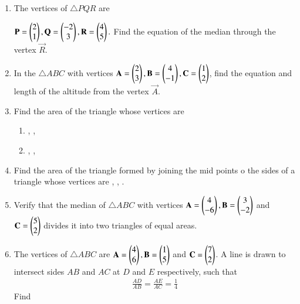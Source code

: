 \begin{enumerate}[label=\arabic*.,ref=\thesubsection.\theenumi]
\item The vertices of $\triangle PQR$ are 

$
\mathbf{P} = \begin{pmatrix}2 \\1\end{pmatrix},
\mathbf{Q} = \begin{pmatrix}-2\\3\end{pmatrix},
\mathbf{R} = \begin{pmatrix}4\\5\end{pmatrix}.
$
Find the equation of the median through the vertex $\vec{R}$.
\item In the $\triangle ABC$ with vertices
$
\mathbf{A}=\begin{pmatrix}2\\3\end{pmatrix}, 
\mathbf{B}=\begin{pmatrix}4\\-1\end{pmatrix},
 \mathbf{C}=\begin{pmatrix}1\\2\end{pmatrix}
$,
find the equation and length of the altitude from the vertex $\vec{A}$.
\item Find the area of the triangle whose vertices are
\begin{enumerate}
\item {}, ,  
\item  {},  ,  
\end{enumerate}
\item Find the area of the triangle formed by joining the mid points o the sides of a triangle whose vertices are  ,  ,  .
\item Verify that the median of $\triangle ABC$ with vertices $\mathbf{A}=\begin{pmatrix}4\\-6\end{pmatrix},  \mathbf{B}=\begin{pmatrix}3\\-2\end{pmatrix}$ and  $\mathbf{C} =  \begin{pmatrix}5\\2\end{pmatrix}$ divides it into two triangles of equal areas.
\item The vertices of $\triangle ABC$ are $\mathbf{A}=\begin{pmatrix}4\\6\end{pmatrix},  \mathbf{B}=\begin{pmatrix}1\\5\end{pmatrix}$ and  $\mathbf{C} =  \begin{pmatrix}7\\2\end{pmatrix}$.  A line is drawn to intersect sides $AB$ and $AC$ at $D$ and $E$ respectively, such that
\begin{align}
\frac{AD}{AB}=\frac{AE}{AC}= \frac{1}{4}
\end{align}
%
Find 
\begin{align}

\end{align}
\end{enumerate}
